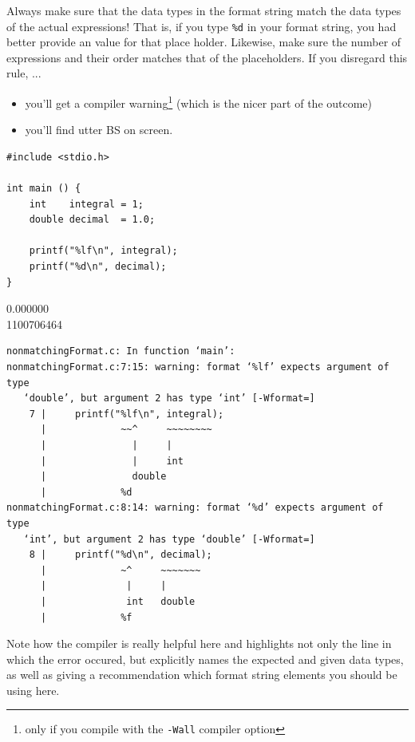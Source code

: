 \begin{warnbox}
Always make sure that the data types in the format string match the data types of the actual expressions! That is, if you type \texttt{\%d} in your format string, you had better provide an  value for that place holder. Likewise, make sure the number of expressions and their order matches that of the placeholders. If you disregard this rule, ...
\begin{itemize}
\item you'll get a compiler warning\footnote{only if you compile with the \texttt{-Wall} compiler option} (which is the nicer part of the outcome)
\item you'll find utter BS on screen.
\end{itemize}

\begin{tcbraster}[raster columns=2,
                  raster equal height,
                  nobeforeafter,
                  raster column skip=0.2cm]
\begin{warnbox}[nonmatchingFormat.c, leftupper=7mm]
\begin{verbatim}
#include <stdio.h>

int main () {
    int    integral = 1;
    double decimal  = 1.0;
    
    printf("%lf\n", integral);
    printf("%d\n", decimal);
}
\end{verbatim}
\end{warnbox}
%
\begin{cmdbox}
0.000000 \\
1100706464
\end{cmdbox}
\end{tcbraster}
%
\begin{cmdbox}
\begin{verbatim}
nonmatchingFormat.c: In function ‘main’:
nonmatchingFormat.c:7:15: warning: format ‘%lf’ expects argument of type 
   ‘double’, but argument 2 has type ‘int’ [-Wformat=]
    7 |     printf("%lf\n", integral);
      |             ~~^     ~~~~~~~~
      |               |     |
      |               |     int
      |               double
      |             %d
nonmatchingFormat.c:8:14: warning: format ‘%d’ expects argument of type 
   ‘int’, but argument 2 has type ‘double’ [-Wformat=]
    8 |     printf("%d\n", decimal);
      |             ~^     ~~~~~~~
      |              |     |
      |              int   double
      |             %f
\end{verbatim}
\end{cmdbox}

Note how the compiler is really helpful here and highlights not only the line in which the error occured, but explicitly names the expected and given data types, as well as giving a recommendation which format string elements you should be using here.
\end{warnbox}

